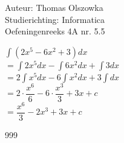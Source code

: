 \documentclass[a4paper]{article}
\newcommand{\dint}{\displaystyle\int}
\begin{document}
\noindent \large Auteur: Thomas Olszowka \\
\noindent \large Studierichting: Informatica \\
\noindent \large Oefeningenreeks 4A nr. 5.5  \\



\medskip

\normalsize

$\dint (2x^5 -6x^2 +3) dx$ \\

$= \dint 2x^5 dx - \dint 6x^2 dx + \dint 3 dx$ \\

$= 2 \dint x^5 dx -6 \dint x^2 dx +3 \dint dx$ \\

$= 2 \cdot \dfrac{x^6}{6} -6 \cdot \dfrac{x^3}{3} + 3x + c$ \\

$= \dfrac{x^6}{3} - 2x^3 + 3x + c$


\begin{thebibliography}{999}
\end{thebibliography}
\end{document}
